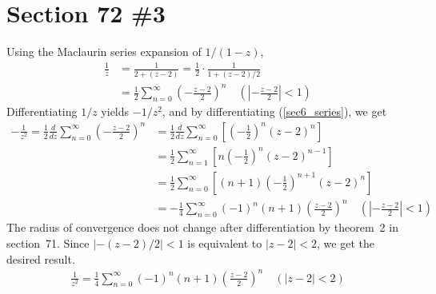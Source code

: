 \documentclass{scrartcl}
\begin{document}
\section{Section 72 \#3}
Using the Maclaurin series expansion of \(1 / (1 - z)\),
\begin{align}
  \nonumber \frac{1}{z}
  \nonumber &= \frac{1}{2 + (z - 2)}
  \nonumber = \frac{1}{2} \cdot \frac{1}{1 + (z - 2) / 2} \\
  \label{sec6_series} &= \frac{1}{2} \sum^\infty_{n = 0} \left( -\frac{z - 2}{2} \right)^n \quad \left( \left| -\frac{z - 2}{2} \right| < 1 \right)
\end{align}
Differentiating \(1 / z\) yields \(-1 / z^2\), and by differentiating (\ref{sec6_series}), we get
\begin{align*}
  -\frac{1}{z^2}
  = \frac{1}{2} \frac{d}{dz} \sum^\infty_{n = 0} \left( -\frac{z - 2}{2} \right)^n
  &= \frac{1}{2} \frac{d}{dz} \sum^\infty_{n = 0} \left[ \left( -\frac{1}{2} \right)^n (z - 2)^n \right] \\
  &= \frac{1}{2} \sum^\infty_{n = 1} \left[ n \left( -\frac{1}{2} \right)^n (z - 2)^{n - 1} \right] \\
  &= \frac{1}{2} \sum^\infty_{n = 0} \left[ (n + 1) \left( -\frac{1}{2} \right)^{n + 1} (z - 2)^n \right] \\
  &= -\frac{1}{4} \sum^\infty_{n = 0} (-1)^n (n + 1) \left( \frac{z - 2}{2} \right)^n \quad \left( \left| -\frac{z - 2}{2} \right| < 1 \right)
\end{align*}
The radius of convergence does not change after differentiation by theorem~2 in section~71.
Since \(|-(z - 2) / 2| < 1\) is equivalent to \(|z - 2| < 2\), we get the desired result.
\begin{align*}
  \frac{1}{z^2} = \frac{1}{4} \sum^\infty_{n = 0} (-1)^n (n + 1) \left( \frac{z - 2}{2} \right)^n \quad (|z - 2| < 2)
\end{align*}
\end{document}
